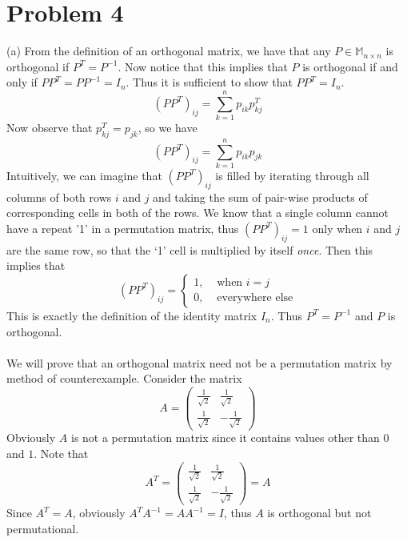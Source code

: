 \documentclass{article}
\begin{document}
\section*{Problem 4}
(a) From the definition of an orthogonal matrix, we have that any $P \in \mathbb{M}_{n\times n}$ is orthogonal if $P^{T} = P^{-1}$. Now notice that this implies that $P$ is orthogonal if and only if $PP^{T} = PP^{-1} = I_{n}$. Thus it is sufficient to show that $PP^{T} = I_{n}$. 
\begin{equation*}
    (PP^{T})_{ij} = \sum_{k=1}^{n}p_{ik}p^{T}_{kj}
\end{equation*}
Now observe that $p^{T}_{kj} = p_{jk}$, so we have
\begin{equation*}
    (PP^{T})_{ij} = \sum_{k=1}^{n} p_{ik}p_{jk}
\end{equation*}
Intuitively, we can imagine that $(PP^{T})_{ij}$ is filled by iterating through all columns of both rows $i$ and $j$ and taking the sum of pair-wise products of corresponding cells in both of the rows. We know that a single column cannot have a repeat '1' in a permutation matrix, thus $(PP^{T})_{ij} = 1$ only when $i$ and $j$ are the same row, so that the `1' cell is multiplied by itself \emph{once}. Then this implies that
\begin{equation*}
(PP^{T})_{ij}=\left\{\begin{array}{lr}
1, & \text { when } i=j\\
0, & \text { everywhere else}
\end{array}\right.
\end{equation*}
This is exactly the definition of the identity matrix $I_{n}$. Thus $P^{T} = P^{-1}$ and $P$ is orthogonal.\\\\
  We will prove that an orthogonal matrix need not be a permutation matrix by method of counterexample. Consider the matrix
\begin{equation*}
A = \begin{pmatrix}
    \frac{1}{\sqrt{2}} & \frac{1}{\sqrt{2}}\\
    \frac{1}{\sqrt{2}} & -\frac{1}{\sqrt{2}}
\end{pmatrix}
\end{equation*}
Obviously $A$ is not a permutation matrix since it contains values other than $0$ and $1$. Note that 
\begin{equation*}
    A^{T} = \begin{pmatrix}
    \frac{1}{\sqrt{2}} & \frac{1}{\sqrt{2}}\\
    \frac{1}{\sqrt{2}} & -\frac{1}{\sqrt{2}}
\end{pmatrix} = A
\end{equation*}
Since $A^{T} = A$, obviously $A^{T}A^{-1} = AA^{-1} = I$, thus $A$ is orthogonal but not permutational. 
\end{document}
